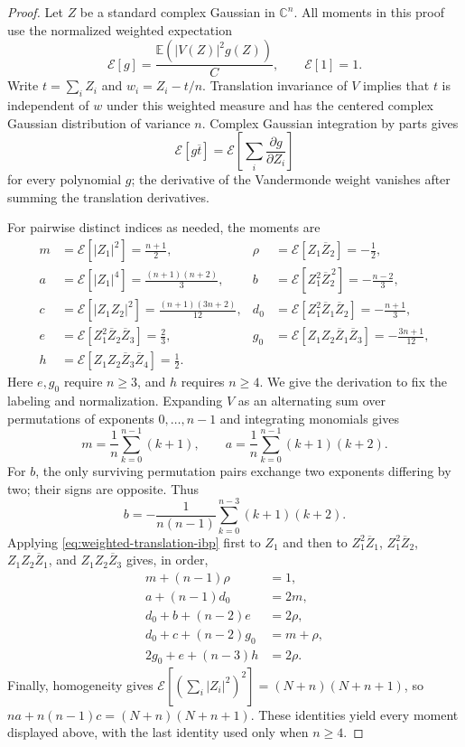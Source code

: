 \documentclass[11pt]{article}
\theoremstyle{remark}
\newcommand{\C}{\mathbb C}
\numberwithin{equation}{section}
\begin{document}
\begin{proof}
Let $Z$ be a standard complex Gaussian in $\C^n$. All moments in
this proof use the normalized weighted expectation
\[
 \mathcal E[g]=\frac{\mathbb E(|V(Z)|^2g(Z))}{C},
 \qquad \mathcal E[1]=1.
\]
Write $t=\sum_iZ_i$ and $w_i=Z_i-t/n$. Translation invariance of
$V$ implies that $t$ is independent of $w$ under this weighted
measure and has the centered complex Gaussian distribution of
variance $n$. Complex Gaussian integration by parts gives
\begin{equation}\label{eq:weighted-translation-ibp}
 \mathcal E[g\overline t]=
 \mathcal E\left[\sum_i\frac{\partial g}{\partial Z_i}\right]
\end{equation}
for every polynomial $g$; the derivative of the Vandermonde weight
vanishes after summing the translation derivatives.

For pairwise distinct indices as needed, the moments are
\begin{align*}
 m&=\mathcal E[|Z_1|^2]=\frac{n+1}{2},&
 \rho&=\mathcal E[Z_1\overline Z_2]=-\frac12,\\
 a&=\mathcal E[|Z_1|^4]=\frac{(n+1)(n+2)}3,&
 b&=\mathcal E[Z_1^2\overline Z_2^{\,2}]=-\frac{n-2}{3},\\
 c&=\mathcal E[|Z_1Z_2|^2]=\frac{(n+1)(3n+2)}{12},&
 d_0&=\mathcal E[Z_1^2\overline Z_1\overline Z_2]
      =-\frac{n+1}{3},\\
 e&=\mathcal E[Z_1^2\overline Z_2\overline Z_3]=\frac23,&
 g_0&=\mathcal E[Z_1Z_2\overline Z_1\overline Z_3]
       =-\frac{3n+1}{12},\\
 h&=\mathcal E[Z_1Z_2\overline Z_3\overline Z_4]=\frac12.
\end{align*}
Here $e,g_0$ require $n\ge3$, and $h$ requires $n\ge4$.
We give the derivation to fix the labeling and normalization.
Expanding $V$ as an alternating sum over permutations of exponents
$0,\ldots,n-1$ and integrating monomials gives
\[
 m=\frac1n\sum_{k=0}^{n-1}(k+1),\qquad
 a=\frac1n\sum_{k=0}^{n-1}(k+1)(k+2).
\]
For $b$, the only surviving permutation pairs exchange two
exponents differing by two; their signs are opposite. Thus
\[
 b=-\frac1{n(n-1)}\sum_{k=0}^{n-3}(k+1)(k+2).
\]
Applying \eqref{eq:weighted-translation-ibp} first to $Z_1$ and
then to $Z_1^2\overline Z_1$, $Z_1^2\overline Z_2$,
$Z_1Z_2\overline Z_1$, and $Z_1Z_2\overline Z_3$ gives, in order,
\begin{align*}
 m+(n-1)\rho&=1,\\
 a+(n-1)d_0&=2m,\\
 d_0+b+(n-2)e&=2\rho,\\
 d_0+c+(n-2)g_0&=m+\rho,\\
 2g_0+e+(n-3)h&=2\rho.
\end{align*}
Finally, homogeneity gives
$\mathcal E[(\sum_i|Z_i|^2)^2]=(N+n)(N+n+1)$, so
$na+n(n-1)c=(N+n)(N+n+1)$. These identities yield every moment
displayed above, with the last identity used only when $n\ge4$.


\end{proof}
\end{document}
